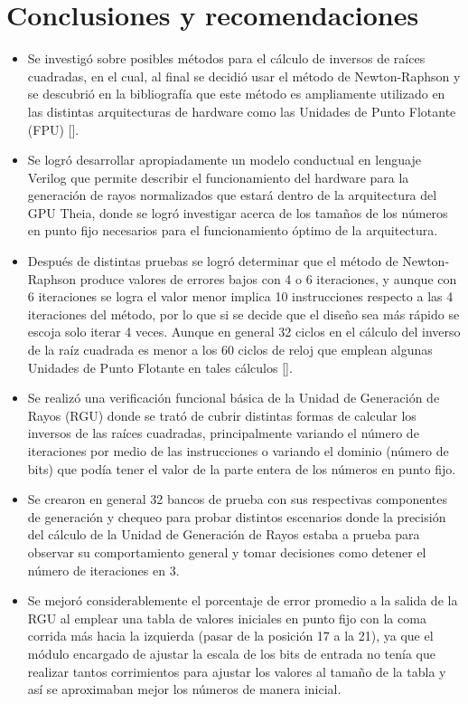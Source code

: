 \chapter{Conclusiones y recomendaciones}

\begin{itemize}

\item Se investigó sobre posibles métodos para el cálculo de inversos de raíces cuadradas, en el cual, al final se decidió usar el método de Newton-Raphson y se descubrió  en la bibliografía que este método es ampliamente utilizado en las distintas arquitecturas de hardware como las Unidades de Punto Flotante (FPU) [\cite{Soderquist1997}].

\item Se logró desarrollar apropiadamente un modelo conductual en lenguaje Verilog que permite describir el funcionamiento del hardware para la generación de rayos normalizados que estará dentro de la arquitectura del GPU Theia, donde se logró investigar acerca de los tamaños de los números en punto fijo necesarios para el funcionamiento óptimo de la arquitectura.

\item Después de distintas pruebas se logró determinar que el método de Newton-Raphson produce valores de errores bajos con 4 o 6 iteraciones, y aunque con 6 iteraciones se logra el valor menor implica 10 instrucciones respecto a las 4 iteraciones del método, por lo que si se decide que el diseño sea más rápido se escoja solo iterar 4 veces. Aunque en general 32 ciclos en el cálculo del inverso de la raíz cuadrada es menor a los 60 ciclos de reloj que emplean algunas Unidades de Punto Flotante en tales cálculos [\cite{Soderquist1997}]. 

\item Se realizó una verificación funcional básica de la Unidad de Generación de Rayos (RGU) donde se trató de cubrir distintas formas de calcular los inversos de las raíces cuadradas, principalmente variando el número de iteraciones por medio de las instrucciones o variando el dominio (número de bits) que podía tener el valor de la parte entera de los números en punto fijo.

\item Se crearon en general 32 bancos de prueba con sus respectivas componentes de generación y chequeo para probar distintos escenarios donde la precisión del cálculo de la Unidad de Generación de Rayos estaba a prueba para observar su comportamiento general y tomar decisiones como detener el número de iteraciones en 3.  

\item Se mejoró considerablemente el porcentaje de error promedio a la salida de la RGU al emplear una tabla de valores iniciales en punto fijo con la coma corrida más hacia la izquierda (pasar de la posición 17 a la 21), ya que el módulo encargado de ajustar la escala de los bits de entrada no tenía que realizar tantos corrimientos para ajustar los valores al tamaño de la tabla y así se aproximaban mejor los números de manera inicial. 

\end{itemize}

